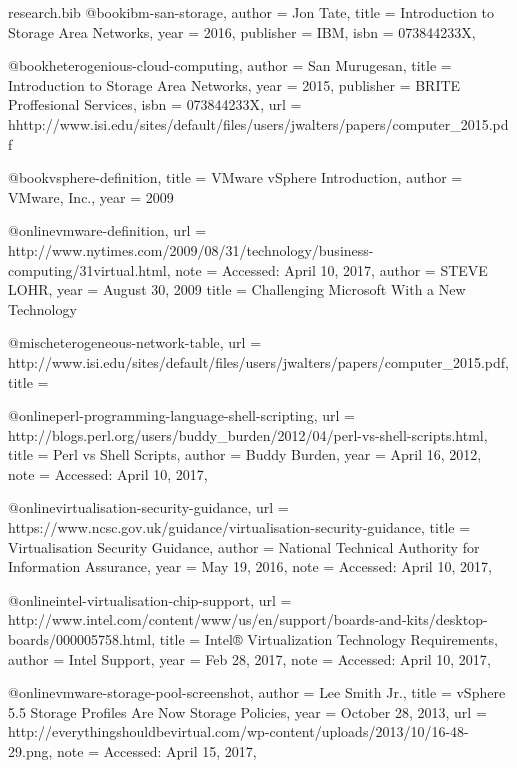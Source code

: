 \documentclass{article}
\begin{document}
\begin{filecontents*}{research.bib}
    @book{ibm-san-storage,
        author    = {Jon Tate},
        title     = {Introduction to Storage Area Networks},
        year      = {2016},
        publisher = {IBM},
        isbn      =  {073844233X},
    }

    @book{heterogenious-cloud-computing,
        author    = {San Murugesan},
        title     = {Introduction to Storage Area Networks},
        year      = {2015},
        publisher = {BRITE Proffesional Services},
        isbn      =  {073844233X},
        url = {hhttp://www.isi.edu/sites/default/files/users/jwalters/papers/computer_2015.pdf}
    }

    @book{vsphere-definition,
        title = {VMware vSphere Introduction},
        author = {VMware, Inc.},
        year = {2009}
    }

    @online{vmware-definition,
        url = {http://www.nytimes.com/2009/08/31/technology/business-computing/31virtual.html},
        note = {Accessed: April 10, 2017},
        author = {STEVE LOHR},
        year = {August 30, 2009}
        title = {Challenging Microsoft With a New Technology}
    }

    @misc{heterogeneous-network-table,
        url = {http://www.isi.edu/sites/default/files/users/jwalters/papers/computer_2015.pdf},
        title = {}
    }

    @online{perl-programming-language-shell-scripting,
        url = {http://blogs.perl.org/users/buddy_burden/2012/04/perl-vs-shell-scripts.html},
        title = {Perl vs Shell Scripts},
        author = {Buddy Burden},
        year = {April 16, 2012},
        note = {Accessed: April 10, 2017},
    }

	@online{virtualisation-security-guidance,
	    url = {https://www.ncsc.gov.uk/guidance/virtualisation-security-guidance},
		title = {Virtualisation Security Guidance},
		author = {National Technical Authority for Information Assurance},
		year = {May 19, 2016},
		note = {Accessed: April 10, 2017},
	}

	@online{intel-virtualisation-chip-support,
		url = {http://www.intel.com/content/www/us/en/support/boards-and-kits/desktop-boards/000005758.html},
		title = { Intel® Virtualization Technology Requirements},
		author = {Intel Support},
		year = {Feb 28, 2017},
		note = {Accessed: April 10, 2017},
	}

	@online{vmware-storage-pool-screenshot,
		author  = {Lee Smith Jr.},
		title   = {vSphere 5.5 Storage Profiles Are Now Storage Policies},
		year    = {October 28, 2013},
		url     = {http://everythingshouldbevirtual.com/wp-content/uploads/2013/10/16-48-29.png},
		note = {Accessed: April 15, 2017},
	}

\end{filecontents*}


\end{document}
